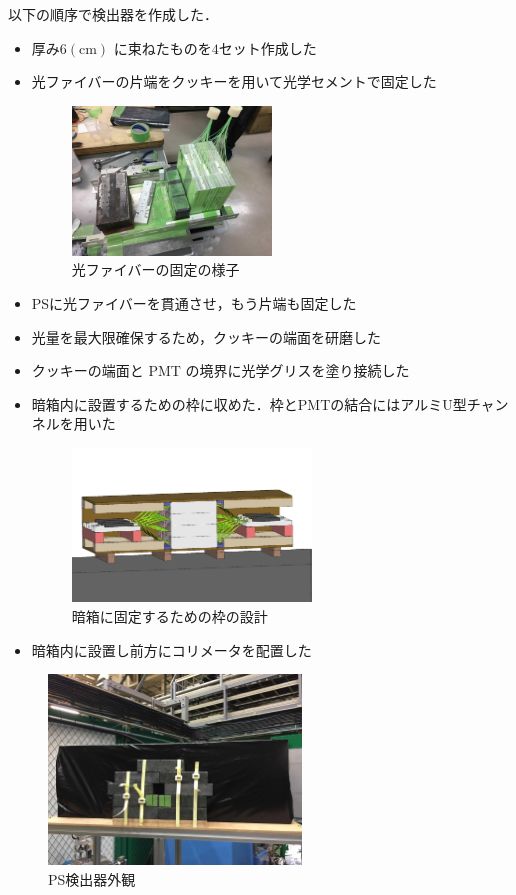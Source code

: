 以下の順序で検出器を作成した．
  \begin{itemize}
    \item 厚み$6(\mathrm{cm})$ に束ねたものを$4$セット作成した
    \item 光ファイバーの片端をクッキーを用いて光学セメントで固定した
       \begin{figure}[H]
         \centering
         \includegraphics[width=0.5\textwidth]{figure/hayakawa/ps_kotei.jpg}
         \caption{光ファイバーの固定の様子}
       \end{figure}
    \item PSに光ファイバーを貫通させ，もう片端も固定した
    \item 光量を最大限確保するため，クッキーの端面を研磨した
    \item クッキーの端面と PMT の境界に光学グリスを塗り接続した
    \item 暗箱内に設置するための枠に収めた．枠とPMTの結合にはアルミU型チャンネルを用いた
       \begin{figure}[H]
         \centering
         \includegraphics[width=0.6\textwidth]{figure/hayakawa/waku1.png}
         \caption{暗箱に固定するための枠の設計}
       \end{figure}
    \item 暗箱内に設置し前方にコリメータを配置した
  \end{itemize}



\begin{figure} [H]
    \centering
    \includegraphics[width=0.6\textwidth]{figure/hayakawa/PS_real.jpg}
    \caption{PS検出器外観}
\end{figure}

